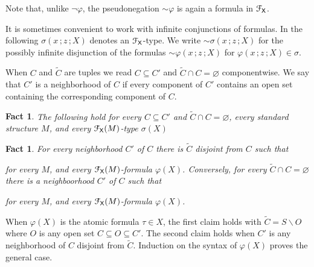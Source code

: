 \documentclass{amsproc}
\makeatletter
\newcounter{thm}
\theoremstyle{mio}
\newtheorem{fact}[thm]{Fact}\tcolorboxenvironment{fact}{mythm}
\providecommand{\proofNameStyle}{\bfseries}
\renewenvironment{proof}[1][\proofname]{\par
  \pushQED{\qed}%
  \normalfont%
  \trivlist
  \item[\hskip\labelsep
        \proofNameStyle
    #1\@addpunct{.}]\ignorespaces
}{%
  \popQED\endtrivlist\@endpefalse
}
\makeatother
\begin{document}
Note that, unlike $\neg\varphi$, the pseudonegation ${\sim}\varphi$ is again a formula in ${\EuScript F}_{\sf X}$.

It is sometimes convenient to work with infinite conjunctions of formulas.
In the following $\sigma(x\,;z\,;X)$ denotes an ${\EuScript F}_{\sf X}$-type.
We write ${\sim}\sigma(x\,;z\,;X)$ for the possibly infinite disjunction of the formulas ${\sim}\varphi(x\,;z\,;X)$ for $\varphi(x\,;z\,;X)\in\sigma$.

When $C$ and $\tilde C$ are tuples we read $C\subseteq C'$ and $\tilde C\cap C=\varnothing$ componentwise.
We say that $C'$ is a neighborhood of $C$ if every component of $C'$ contains an open set containing the corresponding component of $C$.

\begin{fact}\label{fact_trivial}
  The following hold for every $C\subseteq C'$ and $\tilde C\cap C=\varnothing$, every standard structure $M$, and every ${\EuScript F}_{\sf X}(M)$-type $\sigma(X)$\smallskip

  \smallskip

  \smallskip
  
\end{fact}

\begin{fact}
  For every neighborhood $C'$ of $C$ there is $\tilde C$ disjoint from $C$ such that\smallskip
  
  \smallskip

  for every $M$, and every ${\EuScript F}_{\sf X}(M)$-formula $\varphi(X)$.
  Conversely, for every $\tilde C\cap C=\varnothing$ there is a neighboorhood $C'$ of $C$ such that

  \smallskip

  for every $M$, and every ${\EuScript F}_{\sf X}(M)$-formula $\varphi(X)$.
\end{fact}

\begin{proof}
  When $\varphi(X)$ is the atomic formula $\tau\in X$, the first claim holds with $\tilde C=S\smallsetminus O$ where $O$ is any open set $C\subseteq O\subseteq C'$.
  The second claim holds when $C'$ is any neighborhood of $C$ disjoint from $\tilde C$.
  Induction on the syntax of $\varphi(X)$ proves the general case.
\end{proof}
\end{document}
